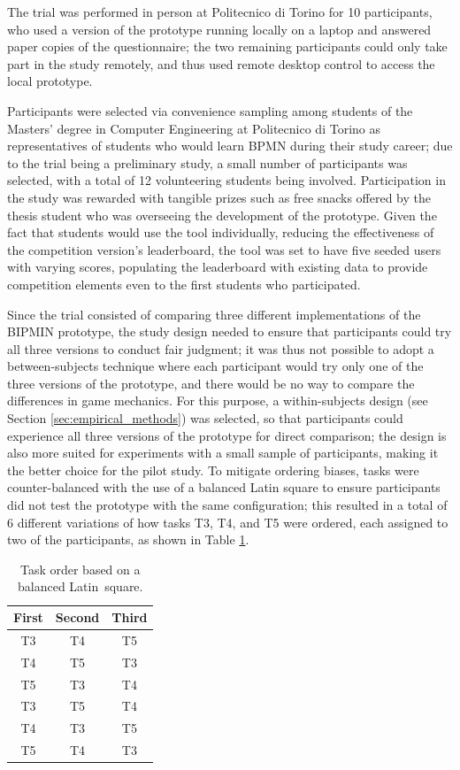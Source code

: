 The trial was performed in person at Politecnico di Torino for 10 participants, who used a version of the prototype running locally on a laptop and answered paper copies of the questionnaire; the two remaining participants could only take part in the study remotely, and thus used remote desktop control to access the local prototype.

Participants were selected via convenience sampling among students of the Masters' degree in Computer Engineering at Politecnico di Torino as representatives of students who would learn BPMN during their study career; due to the trial being a preliminary study, a small number of participants was selected, with a total of 12 volunteering students being involved. Participation in the study was rewarded with tangible prizes such as free snacks offered by the thesis student who was overseeing the development of the prototype. Given the fact that students would use the tool individually, reducing the effectiveness of the competition version's leaderboard, the tool was set to have five seeded users with varying scores, populating the leaderboard with existing data to provide competition elements even to the first students who participated.

Since the trial consisted of comparing three different implementations of the BIPMIN prototype, the study design needed to ensure that participants could try all three versions to conduct fair judgment; it was thus not possible to adopt a between-subjects technique where each participant would try only one of the three versions of the prototype, and there would be no way to compare the differences in game mechanics. For this purpose, a within-subjects design (see Section \ref{sec:empirical_methods}) was selected, so that participants could experience all three versions of the prototype for direct comparison; the design is also more suited for experiments with a small sample of participants, making it the better choice for the pilot study. To mitigate ordering biases, tasks were counter-balanced with the use of a balanced Latin square to ensure participants did not test the prototype with the same configuration; this resulted in a total of 6 different variations of how tasks T3, T4, and T5 were ordered, each assigned to two of the participants, as shown in Table \ref{tab:latinsquare}.

\begin{table}[H] 
\centering
\small
\caption{Task order based on a balanced Latin~square.} 
\setlength{\tabcolsep}{12.2mm}
\begin{tabular}{ccc} \toprule
\textbf{First} & \textbf{Second}& \textbf{Third}\\ \midrule
T3 & T4 & T5 \\
T4 & T5 & T3 \\
T5 & T3 & T4 \\
T3 & T5 & T4 \\
T4 & T3 & T5 \\
T5 & T4 & T3 \\ \bottomrule
\end{tabular}
\label{tab:latinsquare}
\end{table}

